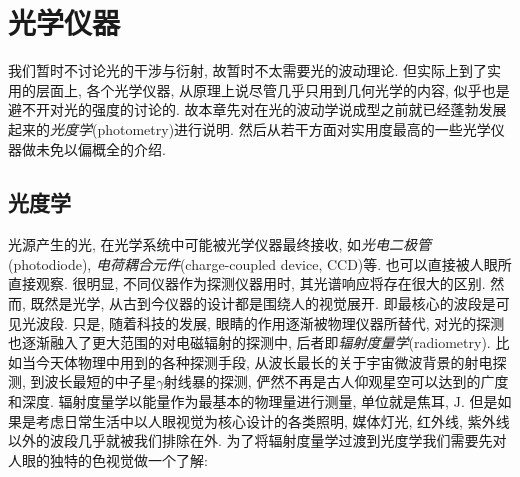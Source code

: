\chapter{光学仪器}


我们暂时不讨论光的干涉与衍射, 故暂时不太需要光的波动理论. 但实际上到了实用的层面上, 各个光学仪器, 从原理上说尽管几乎只用到几何光学的内容, 似乎也是避不开对光的强度的讨论的. 故本章先对在光的波动学说成型之前就已经蓬勃发展起来的\emph{光度学}(photometry)进行说明. 然后从若干方面对实用度最高的一些光学仪器做未免以偏概全的介绍.



\section{光度学}


光源产生的光, 在光学系统中可能被光学仪器最终接收, 如\emph{光电二极管}(photodiode), \emph{电荷耦合元件}(charge-coupled device, CCD)等. 也可以直接被人眼所直接观察. 很明显, 不同仪器作为探测仪器用时, 其光谱响应将存在很大的区别. 然而, 既然是光学, 从古到今仪器的设计都是围绕人的视觉展开. 即最核心的波段是可见光波段. 只是, 随着科技的发展, 眼睛的作用逐渐被物理仪器所替代, 对光的探测也逐渐融入了更大范围的对电磁辐射的探测中, 后者即\emph{辐射度量学}(radiometry). 比如当今天体物理中用到的各种探测手段, 从波长最长的关于宇宙微波背景的射电探测, 到波长最短的中子星$\gamma$射线暴的探测, 俨然不再是古人仰观星空可以达到的广度和深度. 辐射度量学以能量作为最基本的物理量进行测量, 单位就是焦耳, $\mathrm{J}$. 但是如果是考虑日常生活中以人眼视觉为核心设计的各类照明, 媒体灯光, 红外线, 紫外线以外的波段几乎就被我们排除在外. 为了将辐射度量学过渡到光度学我们需要先对人眼的独特的色视觉做一个了解:

